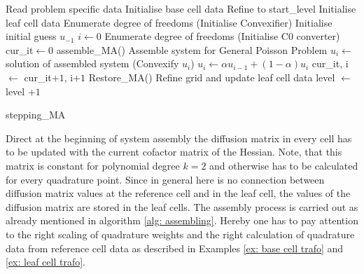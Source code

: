 \begin{algorithm}[H]
\begin{algorithmic}
	\State Read problem specific data
	\State Initialise base cell data
	\State Refine to start\_level
	\State Initialise leaf cell data
	\State Enumerate degree of freedoms
	\State (Initialise Convexifier)
	\State Initialise initial guess $u_{-1}$
	\State $i \gets 0$
		\State Enumerate degree of freedoms
		\State (Initialise C0 converter) 
		\State cur\_it$ \gets 0$
			\State  assemble\_MA()                              \Comment Assemble system for General Poisson Problem
			\State $u_i \gets$ solution of assembled system
			\State (Convexify $u_i$)		 
			\State $u_i \gets \alpha u_{i-1}  +(1-\alpha) u_i$
			\State	cur\_it, i $\gets$ cur\_it$+1$, i$+1$
			\State Restore\_MA() 		
		\EndWhile
		\State Refine grid and update leaf cell data
		\State level $\gets$ level $+1$
	\EndWhile
\end{algorithmic}
\caption{stepping\_MA}
\label{alg: stepping}
\end{algorithm}

Direct at the beginning of system assembly the diffusion matrix in every cell has to be updated with the current cofactor matrix of the Hessian. Note, that this matrix is constant for polynomial degree $k=2$ and otherwise has to be calculated for every quadrature point. Since in general here is no connection between diffusion matrix values at the reference cell and in the leaf cell, the values of the diffusion matrix are stored in the leaf cells.
The assembly process is carried out as already mentioned in algorithm \ref{alg: assembling}. Hereby one has to pay attention to the right scaling of quadrature weights and the right calculation of quadrature data from reference cell data as described in Examples \ref{ex: base cell trafo} and \ref{ex: leaf cell trafo}. 

